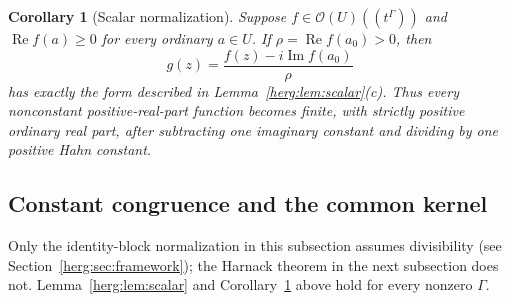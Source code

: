 \documentclass[11pt,letterpaper]{article}
\newtheorem{corollary}[theorem]{Corollary}
\theoremstyle{definition}
\newcommand{\OU}[1]{\mathcal O(#1)((t^\Gamma))}
\newcommand{\Rea}{\operatorname{Re}}
\newcommand{\Ima}{\operatorname{Im}}
\numberwithin{equation}{section}
\begin{document}
\begin{corollary}[Scalar normalization]\label{herg:cor:scalarnormal}
Suppose $f\in\OU{U}$ and $\Rea f(a)\ge0$ for every ordinary $a\in U$.
If $\rho=\Rea f(a_0)>0$, then
\[
 g(z)=\frac{f(z)-i\Ima f(a_0)}{\rho}
\]
has exactly the form described in Lemma~\ref{herg:lem:scalar}(c). Thus every nonconstant positive-real-part function becomes finite, with strictly positive ordinary real part, after subtracting one imaginary constant and dividing by one positive Hahn constant.
\end{corollary}

\subsection{Constant congruence and the common kernel}

Only the identity-block normalization in this subsection assumes divisibility (see Section~\ref{herg:sec:framework}); the Harnack theorem in the next subsection does not. Lemma~\ref{herg:lem:scalar} and Corollary~\ref{herg:cor:scalarnormal} above hold for every nonzero $\Gamma$.
\end{document}
